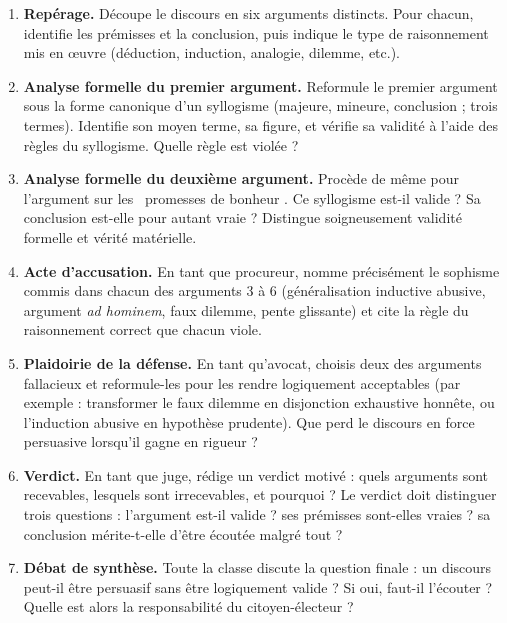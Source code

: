 \documentclass[11pt]{article}
\newcommand{\cle}[1]{{\popxbold\color{popdark}#1}}
\newcounter{popsec}
\newcounter{popsub}
\newcommand{\courssub}[1]{%
  \stepcounter{popsub}%
  \par\vspace{9pt}\noindent{\popxbold\fontsize{11.5}{13}\selectfont\color{popink}{\color{poporange}\thepopsec.\thepopsub}\hspace{6pt}#1}\par\nopagebreak\vspace{4pt}
}
\begin{document}
\begin{enumerate}
\item \textbf{Repérage.} Découpe le discours en six arguments distincts. Pour chacun, identifie les prémisses et la conclusion, puis indique le type de raisonnement mis en œuvre (déduction, induction, analogie, dilemme, etc.).
\item \textbf{Analyse formelle du premier argument.} Reformule le premier argument sous la forme canonique d'un syllogisme (majeure, mineure, conclusion ; trois termes). Identifie son moyen terme, sa figure, et vérifie sa validité à l'aide des règles du syllogisme. Quelle règle est violée ?
\item \textbf{Analyse formelle du deuxième argument.} Procède de même pour l'argument sur les \guillemotleft\ promesses de bonheur \guillemotright. Ce syllogisme est-il valide ? Sa conclusion est-elle pour autant vraie ? Distingue soigneusement validité formelle et vérité matérielle.
\item \textbf{Acte d'accusation.} En tant que procureur, nomme précisément le sophisme commis dans chacun des arguments 3 à 6 (généralisation inductive abusive, argument \emph{ad hominem}, faux dilemme, pente glissante) et cite la règle du raisonnement correct que chacun viole.
\item \textbf{Plaidoirie de la défense.} En tant qu'avocat, choisis deux des arguments fallacieux et reformule-les pour les rendre logiquement acceptables (par exemple : transformer le faux dilemme en disjonction exhaustive honnête, ou l'induction abusive en hypothèse prudente). Que perd le discours en force persuasive lorsqu'il gagne en rigueur ?
\item \textbf{Verdict.} En tant que juge, rédige un verdict motivé : quels arguments sont recevables, lesquels sont irrecevables, et pourquoi ? Le verdict doit distinguer trois questions : l'argument est-il valide ? ses prémisses sont-elles vraies ? sa conclusion mérite-t-elle d'être écoutée malgré tout ?
\item \textbf{Débat de synthèse.} Toute la classe discute la question finale : un discours peut-il être \cle{persuasif} sans être logiquement \cle{valide} ? Si oui, faut-il l'écouter ? Quelle est alors la responsabilité du citoyen-électeur ?
\end{enumerate}

\courssub{Ressources à mobiliser}
\end{document}
